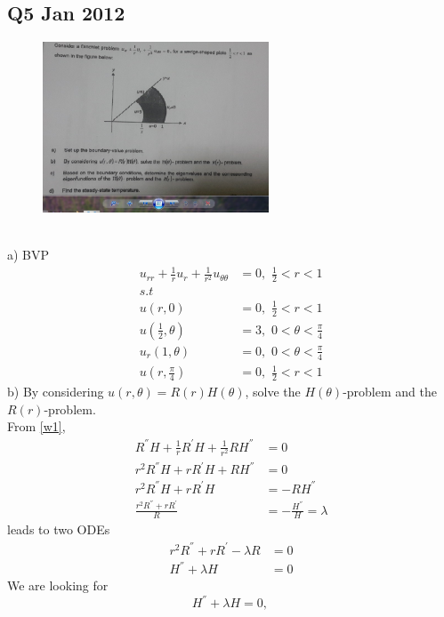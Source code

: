 \subsection{Q5 Jan 2012}
\begin{figure}[hbt!]\centering
\includegraphics[width=0.6\textwidth]{wedge2.jpg}
\end{figure}
\\
a) BVP
\begin{align}
u_{rr}+\frac{1}{r}u_r+\frac{1}{r^2}u_{\theta\theta}&=0,\,\,\frac{1}{2}<r<1\label{w1}\\
s.t&\\
u(r,0)&=0,\,\,\frac{1}{2}<r<1\label{w2}\\
u(\frac{1}{2},\theta)&=3,\,\,0<\theta<\frac{\pi}{4}\label{w3}\\
u_r(1,\theta)&=0,\,\,0<\theta<\frac{\pi}{4}\label{w4}\\
u(r,\frac{\pi}{4})&=0,\,\,\frac{1}{2}<r<1\label{w5}
\end{align}
b) By considering $u(r,\theta)=R(r)H(\theta)$, solve the $H(\theta)$-problem and the $R(r)$-problem.\\
From \eqref{w1},
\begin{align}
R^{''}H+\frac{1}{r}R^{'}H+\frac{1}{r^2}RH^{''}&=0\nonumber\\
r^2R^{''}H+rR^{'}H+RH^{''}&=0\nonumber\\
r^2R^{''}H+rR^{'}H&=-RH^{''}\nonumber\\
\frac{r^2R^{''}+rR^{'}}{R}&=-\frac{H^{''}}{H}=\lambda\nonumber
\end{align}
leads to two ODEs
\begin{align}
r^2R^{''}+rR^{'}-\lambda R&=0\label{w1a}\\
H^{''}+\lambda H&=0\label{w1b}
\end{align}
We are looking for 
\begin{equation}
H^{''}+\lambda H=0,\,\label{w1aa}
\end{equation}
